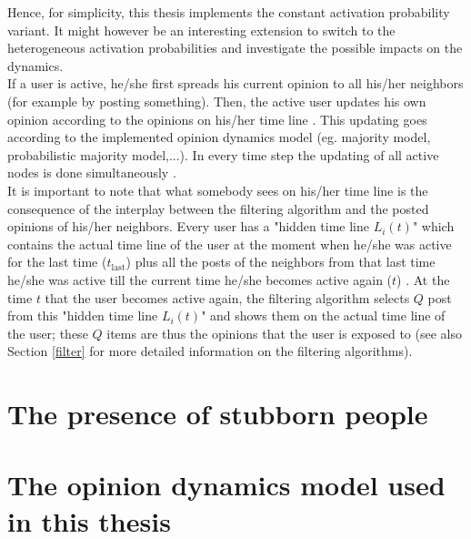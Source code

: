 \documentclass[11 pt , letterpaper , twoside , openright]{book}
\begin{document}
Hence, for simplicity, this thesis implements the constant activation probability variant. It might however be an interesting extension to switch to the heterogeneous activation probabilities and investigate the possible impacts on the dynamics. \\
If a user is active, he/she first spreads his current opinion to all his/her neighbors (for example by posting something). Then, the active user updates his own opinion according to the opinions on his/her time line \cite{Perra2019}. This updating goes according to the implemented opinion dynamics model (eg. majority model, probabilistic majority model,...). In every time step the updating of all active nodes is done simultaneously \cite{Perra2019}.\\
It is important to note that what somebody sees on his/her time line is the consequence of the interplay between the filtering algorithm and the posted opinions of his/her neighbors. Every user has a "hidden time line $L_i(t)$" which contains the actual time line of the user at the moment when he/she was active for the last time ($t_{\text{last}}$) plus all the posts of the neighbors from that last time he/she was active till the current time he/she becomes active again ($t$) \cite{Perra2019}. At the time $t$ that the user becomes active again, the filtering algorithm selects $Q$ post from this "hidden time line $L_i(t)$" and shows them on the actual time line of the user; these $Q$ items are thus the opinions that the user is exposed to \cite{Perra2019} (see also Section \ref{filter} for more detailed information on the filtering algorithms).




\section{The presence of stubborn people}\label{stubb}

\section{The opinion dynamics model used in this thesis}\label{thesisOp}
\end{document}
